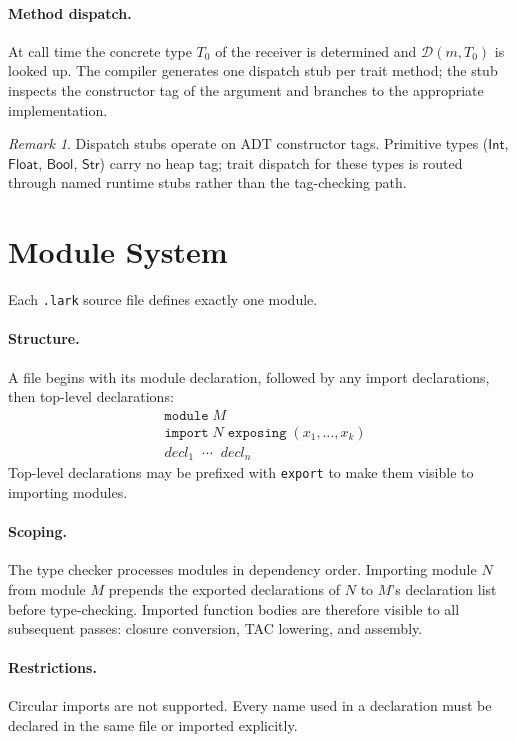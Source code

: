 \documentclass[10pt,a4paper]{article}
\newcommand{\TInt}{\mathsf{Int}}
\newcommand{\TFlt}{\mathsf{Float}}
\newcommand{\TBool}{\mathsf{Bool}}
\newcommand{\TStr}{\mathsf{Str}}
\theoremstyle{plain}
\theoremstyle{definition}
\theoremstyle{remark}
\newtheorem{remark}{Remark}
\begin{document}
\paragraph{Method dispatch.}
At call time the concrete type $T_0$ of the receiver is determined and
$\mathcal{D}(m,T_0)$ is looked up.  The compiler generates one dispatch stub
per trait method; the stub inspects the constructor tag of the argument
and branches to the appropriate implementation.

\begin{remark}
Dispatch stubs operate on ADT constructor tags.  Primitive types
($\TInt$, $\TFlt$, $\TBool$, $\TStr$) carry no heap tag; trait dispatch
for these types is routed through named runtime stubs rather than the
tag-checking path.
\end{remark}

\section{Module System}
\label{sec:modules}

Each \texttt{.lark} source file defines exactly one module.

\paragraph{Structure.}
A file begins with its module declaration, followed by any import
declarations, then top-level declarations:
\begin{align*}
&\mathtt{module}\;M \\
&\mathtt{import}\;N\;\mathtt{exposing}\;(x_1,\ldots,x_k) \\
&\textit{decl}_1\;\;\cdots\;\;\textit{decl}_n
\end{align*}
Top-level declarations may be prefixed with \texttt{export} to make them
visible to importing modules.

\paragraph{Scoping.}
The type checker processes modules in dependency order.  Importing module $N$
from module $M$ prepends the exported declarations of $N$ to $M$'s
declaration list before type-checking.  Imported function bodies are
therefore visible to all subsequent passes: closure conversion, TAC lowering,
and assembly.

\paragraph{Restrictions.}
Circular imports are not supported.  Every name used in a declaration must
be declared in the same file or imported explicitly.
\end{document}
